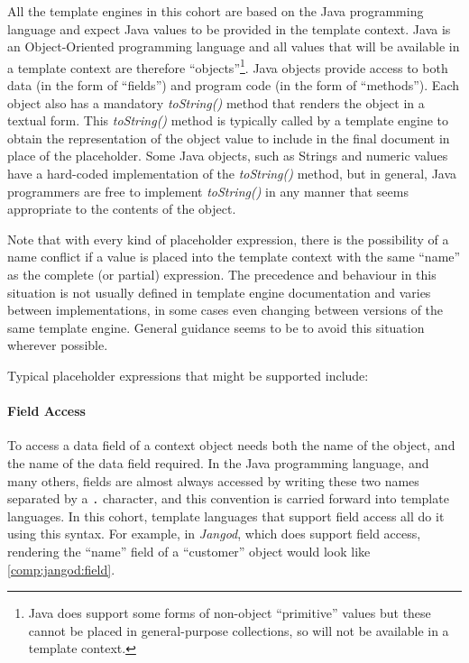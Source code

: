 All the \gls{template engine}s in this cohort are based on the Java \gls{programming language} and expect Java values to be provided in the template context. Java is an Object-Oriented \gls{programming language} \citep{Adenowo2013} and all values that will be available in a template context are therefore \enquote{objects}\footnote{Java does support some forms of non-object \enquote{primitive} values but these cannot be placed in general-purpose collections, so will not be available in a template context.}. Java objects provide access to both data (in the form of \enquote{fields}) and program code (in the form of \enquote{methods}). Each object also has a mandatory \emph{toString()} method that renders the object in a textual form. This \emph{toString()} method is typically called by a \gls{template engine} to obtain the representation of the object value to include in the final document in place of the placeholder. Some Java objects, such as Strings and numeric values have a hard-coded implementation of the \emph{toString()} method, but in general, Java programmers are free to implement \emph{toString()} in any manner that seems appropriate to the contents of the object.

Note that with every kind of placeholder expression, there is the possibility of a name conflict if a value is placed into the template context with the same \enquote{name} as the complete (or partial) expression. The precedence and behaviour in this situation is not usually defined in \gls{template engine} documentation and varies between implementations, in some cases even changing between versions of the same \gls{template engine}. General guidance seems to be to avoid this situation wherever possible.

Typical placeholder expressions that might be supported include:

\paragraph{Field Access}
To access a data field of a context object needs both the name of the object, and the name of the data field required. In the Java \gls{programming language}, and many others, fields are almost always accessed by writing these two names separated by a \verb!.! character, and this convention is carried forward into \gls{template language}s. In this cohort, \gls{template language}s that support field access all do it using this syntax. For example, in \emph{Jangod}, which does support field access, rendering the \enquote{name} field of a \enquote{customer} object would look like \autoref{comp:jangod:field}.

